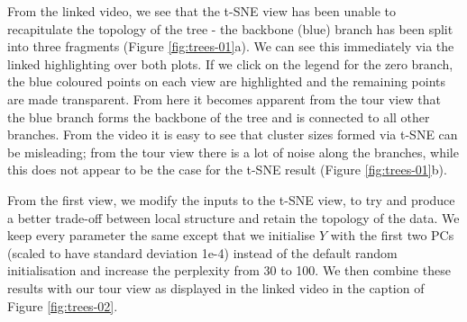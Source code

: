 \documentclass[article,notitle]{jdssv}
\begin{document}
From the linked video, we see that the t-SNE view has been unable to
recapitulate the topology of the tree - the backbone (blue) branch has been
split into three fragments (Figure \ref{fig:trees-01}a). We can see
this immediately via the linked highlighting over both
plots. If we click on the legend for the zero branch, the blue coloured points
on each view are highlighted and the remaining points are made transparent.
From here it becomes apparent from the tour view that the blue branch forms
the backbone of the tree and is connected to all other branches. From the video
it is easy to see that cluster sizes formed via t-SNE can be misleading; from the tour
view there is a lot of noise along the branches, while this does not appear to
be the case for the t-SNE result (Figure \ref{fig:trees-01}b).

From the first view, we modify the inputs to the t-SNE view, to try and produce
a better trade-off between local structure and retain the topology of the data.
We keep every parameter the same except that we initialise \(Y\) with the first
two PCs (scaled to have standard deviation 1e-4) instead of the default random
initialisation and increase the perplexity from 30 to 100. We then combine
these results with our tour view as displayed in the linked video in the caption
of Figure \ref{fig:trees-02}.
\end{document}
